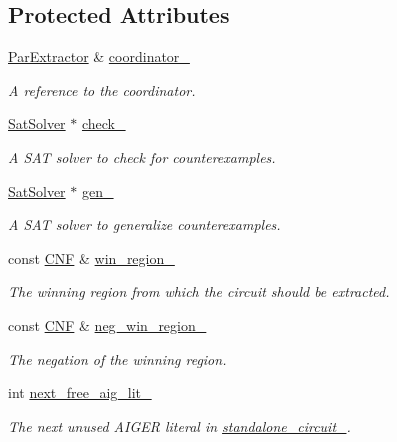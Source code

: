 \subsection*{Protected Attributes}
\begin{DoxyCompactItemize}
\item 
\hyperlink{classParExtractor}{Par\-Extractor} \& \hyperlink{classParExtractorWorker_a749b01fd5ad1a57ae5793db2bb3b4e47}{coordinator\-\_\-}
\begin{DoxyCompactList}\small\item\em A reference to the coordinator. \end{DoxyCompactList}\item 
\hyperlink{classSatSolver}{Sat\-Solver} $\ast$ \hyperlink{classParExtractorWorker_aa501458322a206e0ab66a4005cac963c}{check\-\_\-}
\begin{DoxyCompactList}\small\item\em A S\-A\-T solver to check for counterexamples. \end{DoxyCompactList}\item 
\hyperlink{classSatSolver}{Sat\-Solver} $\ast$ \hyperlink{classParExtractorWorker_aa60776c90a94164e2cfbfd81f77ccb21}{gen\-\_\-}
\begin{DoxyCompactList}\small\item\em A S\-A\-T solver to generalize counterexamples. \end{DoxyCompactList}\item 
const \hyperlink{classCNF}{C\-N\-F} \& \hyperlink{classParExtractorWorker_abccf0d629d4dca3a94cc572130e6d0e9}{win\-\_\-region\-\_\-}
\begin{DoxyCompactList}\small\item\em The winning region from which the circuit should be extracted. \end{DoxyCompactList}\item 
const \hyperlink{classCNF}{C\-N\-F} \& \hyperlink{classParExtractorWorker_a423caaf7f20528eb06b176acc09ae8ee}{neg\-\_\-win\-\_\-region\-\_\-}
\begin{DoxyCompactList}\small\item\em The negation of the winning region. \end{DoxyCompactList}\item 
int \hyperlink{classParExtractorWorker_a07219034862a2f4dabe22ecdc0d04ae0}{next\-\_\-free\-\_\-aig\-\_\-lit\-\_\-}
\begin{DoxyCompactList}\small\item\em The next unused A\-I\-G\-E\-R literal in \hyperlink{classParExtractorWorker_a233a7f99946695b0640e76ead6932fbb}{standalone\-\_\-circuit\-\_\-}. \end{DoxyCompactList}\item 

\end{DoxyCompactItemize}
